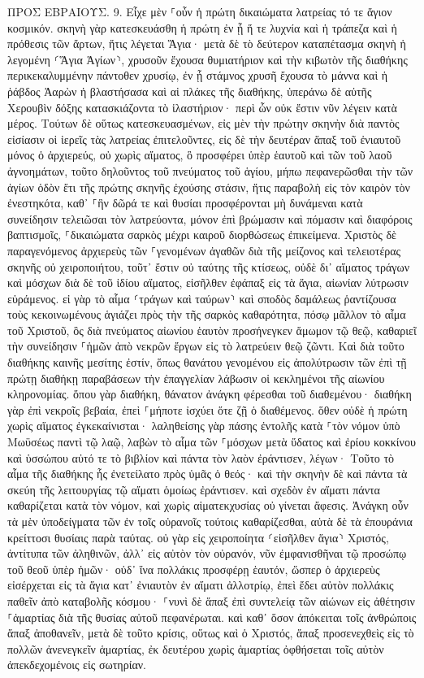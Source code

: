 \documentclass[twoside, 9pt]{extreport}
\begin{document}
ΠΡΟΣ ΕΒΡΑΙΟΥΣ.
9.
Εἶχε μὲν ⸀οὖν ἡ πρώτη δικαιώματα λατρείας τό τε ἅγιον κοσμικόν. 
σκηνὴ γὰρ κατεσκευάσθη ἡ πρώτη ἐν ᾗ ἥ τε λυχνία καὶ ἡ τράπεζα καὶ ἡ πρόθεσις τῶν ἄρτων, ἥτις λέγεται Ἅγια· 
μετὰ δὲ τὸ δεύτερον καταπέτασμα σκηνὴ ἡ λεγομένη ⸂Ἅγια Ἁγίων⸃, 
χρυσοῦν ἔχουσα θυμιατήριον καὶ τὴν κιβωτὸν τῆς διαθήκης περικεκαλυμμένην πάντοθεν χρυσίῳ, ἐν ᾗ στάμνος χρυσῆ ἔχουσα τὸ μάννα καὶ ἡ ῥάβδος Ἀαρὼν ἡ βλαστήσασα καὶ αἱ πλάκες τῆς διαθήκης, 
ὑπεράνω δὲ αὐτῆς Χερουβὶν δόξης κατασκιάζοντα τὸ ἱλαστήριον· περὶ ὧν οὐκ ἔστιν νῦν λέγειν κατὰ μέρος. 
Τούτων δὲ οὕτως κατεσκευασμένων, εἰς μὲν τὴν πρώτην σκηνὴν διὰ παντὸς εἰσίασιν οἱ ἱερεῖς τὰς λατρείας ἐπιτελοῦντες, 
εἰς δὲ τὴν δευτέραν ἅπαξ τοῦ ἐνιαυτοῦ μόνος ὁ ἀρχιερεύς, οὐ χωρὶς αἵματος, ὃ προσφέρει ὑπὲρ ἑαυτοῦ καὶ τῶν τοῦ λαοῦ ἀγνοημάτων, 
τοῦτο δηλοῦντος τοῦ πνεύματος τοῦ ἁγίου, μήπω πεφανερῶσθαι τὴν τῶν ἁγίων ὁδὸν ἔτι τῆς πρώτης σκηνῆς ἐχούσης στάσιν, 
ἥτις παραβολὴ εἰς τὸν καιρὸν τὸν ἐνεστηκότα, καθ᾽ ⸀ἣν δῶρά τε καὶ θυσίαι προσφέρονται μὴ δυνάμεναι κατὰ συνείδησιν τελειῶσαι τὸν λατρεύοντα, 
μόνον ἐπὶ βρώμασιν καὶ πόμασιν καὶ διαφόροις βαπτισμοῖς, ⸀δικαιώματα σαρκὸς μέχρι καιροῦ διορθώσεως ἐπικείμενα. 
Χριστὸς δὲ παραγενόμενος ἀρχιερεὺς τῶν ⸀γενομένων ἀγαθῶν διὰ τῆς μείζονος καὶ τελειοτέρας σκηνῆς οὐ χειροποιήτου, τοῦτ᾽ ἔστιν οὐ ταύτης τῆς κτίσεως, 
οὐδὲ δι᾽ αἵματος τράγων καὶ μόσχων διὰ δὲ τοῦ ἰδίου αἵματος, εἰσῆλθεν ἐφάπαξ εἰς τὰ ἅγια, αἰωνίαν λύτρωσιν εὑράμενος. 
εἰ γὰρ τὸ αἷμα ⸂τράγων καὶ ταύρων⸃ καὶ σποδὸς δαμάλεως ῥαντίζουσα τοὺς κεκοινωμένους ἁγιάζει πρὸς τὴν τῆς σαρκὸς καθαρότητα, 
πόσῳ μᾶλλον τὸ αἷμα τοῦ Χριστοῦ, ὃς διὰ πνεύματος αἰωνίου ἑαυτὸν προσήνεγκεν ἄμωμον τῷ θεῷ, καθαριεῖ τὴν συνείδησιν ⸀ἡμῶν ἀπὸ νεκρῶν ἔργων εἰς τὸ λατρεύειν θεῷ ζῶντι. 
Καὶ διὰ τοῦτο διαθήκης καινῆς μεσίτης ἐστίν, ὅπως θανάτου γενομένου εἰς ἀπολύτρωσιν τῶν ἐπὶ τῇ πρώτῃ διαθήκῃ παραβάσεων τὴν ἐπαγγελίαν λάβωσιν οἱ κεκλημένοι τῆς αἰωνίου κληρονομίας. 
ὅπου γὰρ διαθήκη, θάνατον ἀνάγκη φέρεσθαι τοῦ διαθεμένου· 
διαθήκη γὰρ ἐπὶ νεκροῖς βεβαία, ἐπεὶ ⸀μήποτε ἰσχύει ὅτε ζῇ ὁ διαθέμενος. 
ὅθεν οὐδὲ ἡ πρώτη χωρὶς αἵματος ἐγκεκαίνισται· 
λαληθείσης γὰρ πάσης ἐντολῆς κατὰ ⸀τὸν νόμον ὑπὸ Μωϋσέως παντὶ τῷ λαῷ, λαβὼν τὸ αἷμα τῶν ⸀μόσχων μετὰ ὕδατος καὶ ἐρίου κοκκίνου καὶ ὑσσώπου αὐτό τε τὸ βιβλίον καὶ πάντα τὸν λαὸν ἐράντισεν, 
λέγων· Τοῦτο τὸ αἷμα τῆς διαθήκης ἧς ἐνετείλατο πρὸς ὑμᾶς ὁ θεός· 
καὶ τὴν σκηνὴν δὲ καὶ πάντα τὰ σκεύη τῆς λειτουργίας τῷ αἵματι ὁμοίως ἐράντισεν. 
καὶ σχεδὸν ἐν αἵματι πάντα καθαρίζεται κατὰ τὸν νόμον, καὶ χωρὶς αἱματεκχυσίας οὐ γίνεται ἄφεσις. 
Ἀνάγκη οὖν τὰ μὲν ὑποδείγματα τῶν ἐν τοῖς οὐρανοῖς τούτοις καθαρίζεσθαι, αὐτὰ δὲ τὰ ἐπουράνια κρείττοσι θυσίαις παρὰ ταύτας. 
οὐ γὰρ εἰς χειροποίητα ⸂εἰσῆλθεν ἅγια⸃ Χριστός, ἀντίτυπα τῶν ἀληθινῶν, ἀλλ᾽ εἰς αὐτὸν τὸν οὐρανόν, νῦν ἐμφανισθῆναι τῷ προσώπῳ τοῦ θεοῦ ὑπὲρ ἡμῶν· 
οὐδ᾽ ἵνα πολλάκις προσφέρῃ ἑαυτόν, ὥσπερ ὁ ἀρχιερεὺς εἰσέρχεται εἰς τὰ ἅγια κατ᾽ ἐνιαυτὸν ἐν αἵματι ἀλλοτρίῳ, 
ἐπεὶ ἔδει αὐτὸν πολλάκις παθεῖν ἀπὸ καταβολῆς κόσμου· ⸀νυνὶ δὲ ἅπαξ ἐπὶ συντελείᾳ τῶν αἰώνων εἰς ἀθέτησιν ⸀ἁμαρτίας διὰ τῆς θυσίας αὐτοῦ πεφανέρωται. 
καὶ καθ᾽ ὅσον ἀπόκειται τοῖς ἀνθρώποις ἅπαξ ἀποθανεῖν, μετὰ δὲ τοῦτο κρίσις, 
οὕτως καὶ ὁ Χριστός, ἅπαξ προσενεχθεὶς εἰς τὸ πολλῶν ἀνενεγκεῖν ἁμαρτίας, ἐκ δευτέρου χωρὶς ἁμαρτίας ὀφθήσεται τοῖς αὐτὸν ἀπεκδεχομένοις εἰς σωτηρίαν. 
\end{document}

